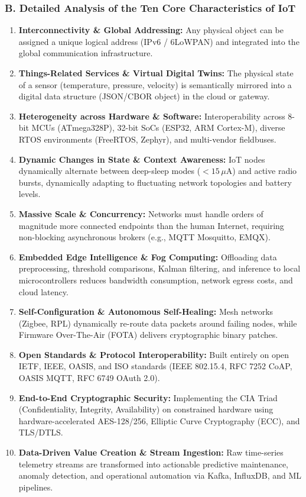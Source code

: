 \documentclass[11pt,a4paper]{article}
\begin{document}
\subsubsection*{B. Detailed Analysis of the Ten Core Characteristics of IoT}
\begin{enumerate}[leftmargin=*]
    \item \textbf{Interconnectivity \& Global Addressing:} Any physical object can be assigned a unique logical address (IPv6 / 6LoWPAN) and integrated into the global communication infrastructure.
    \item \textbf{Things-Related Services \& Virtual Digital Twins:} The physical state of a sensor (temperature, pressure, velocity) is semantically mirrored into a digital data structure (JSON/CBOR object) in the cloud or gateway.
    \item \textbf{Heterogeneity across Hardware \& Software:} Interoperability across 8-bit MCUs (ATmega328P), 32-bit SoCs (ESP32, ARM Cortex-M), diverse RTOS environments (FreeRTOS, Zephyr), and multi-vendor fieldbuses.
    \item \textbf{Dynamic Changes in State \& Context Awareness:} IoT nodes dynamically alternate between deep-sleep modes ($<15\,\mu\text{A}$) and active radio bursts, dynamically adapting to fluctuating network topologies and battery levels.
    \item \textbf{Massive Scale \& Concurrency:} Networks must handle orders of magnitude more connected endpoints than the human Internet, requiring non-blocking asynchronous brokers (e.g., MQTT Mosquitto, EMQX).
    \item \textbf{Embedded Edge Intelligence \& Fog Computing:} Offloading data preprocessing, threshold comparisons, Kalman filtering, and inference to local microcontrollers reduces bandwidth consumption, network egress costs, and cloud latency.
    \item \textbf{Self-Configuration \& Autonomous Self-Healing:} Mesh networks (Zigbee, RPL) dynamically re-route data packets around failing nodes, while Firmware Over-The-Air (FOTA) delivers cryptographic binary patches.
    \item \textbf{Open Standards \& Protocol Interoperability:} Built entirely on open IETF, IEEE, OASIS, and ISO standards (IEEE 802.15.4, RFC 7252 CoAP, OASIS MQTT, RFC 6749 OAuth 2.0).
    \item \textbf{End-to-End Cryptographic Security:} Implementing the CIA Triad (Confidentiality, Integrity, Availability) on constrained hardware using hardware-accelerated AES-128/256, Elliptic Curve Cryptography (ECC), and TLS/DTLS.
    \item \textbf{Data-Driven Value Creation \& Stream Ingestion:} Raw time-series telemetry streams are transformed into actionable predictive maintenance, anomaly detection, and operational automation via Kafka, InfluxDB, and ML pipelines.
\end{enumerate}
\end{document}
